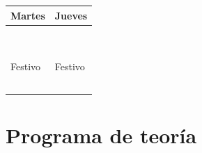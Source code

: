 \documentclass[a4paper,12pt]{article}
\begin{document}
\newcommand{\juevesA}{29 de enero}
\newcommand{\juevesB}{5 de febrero}
\newcommand{\juevesC}{12 de febrero}
\newcommand{\juevesD}{19 de febrero}
\newcommand{\juevesE}{26 de febrero}
\newcommand{\juevesF}{5 de marzo}
\newcommand{\juevesG}{12 de marzo}
\newcommand{\juevesH}{19 de marzo}
\newcommand{\juevesI}{26 de marzo}
\newcommand{\juevesJ}{9 de abril}
\newcommand{\juevesK}{16 de abril}
\newcommand{\juevesL}{23 de abril}
\newcommand{\juevesM}{30 de abril}
\newcommand{\juevesN}{7 de mayo}

\begin{tabular}{|l|l|}
  \hline
 Martes & Jueves \\ \hline \hline
 \nameref{cal:martesA} & \nameref{cal:juevesA} \\ \hline
 \nameref{cal:martesB} & \nameref{cal:juevesB} \\ \hline  
 \nameref{cal:martesC} & \nameref{cal:juevesC} \\ \hline
 \nameref{cal:martesD} & \nameref{cal:juevesD} \\ \hline
 \nameref{cal:martesE} & \nameref{cal:juevesE} \\ \hline
 \nameref{cal:martesF} & \nameref{cal:juevesF} \\ \hline
 \nameref{cal:martesG} & \nameref{cal:juevesG} \\ \hline
 \nameref{cal:martesH} & \nameref{cal:juevesH} \\ \hline
 \nameref{cal:martesI} & \nameref{cal:juevesI} \\ \hline
 Festivo               & Festivo               \\ \hline
 \nameref{cal:martesJ} & \nameref{cal:juevesJ} \\ \hline
 \nameref{cal:martesK} & \nameref{cal:juevesK} \\ \hline
 \nameref{cal:martesL} & \nameref{cal:juevesL} \\ \hline
 \nameref{cal:martesM} & \nameref{cal:juevesM} \\ \hline
 \nameref{cal:martesN} & \nameref{cal:juevesN} \\ \hline
\end{tabular}

\newpage

\section{Programa de teoría}
\end{document}
